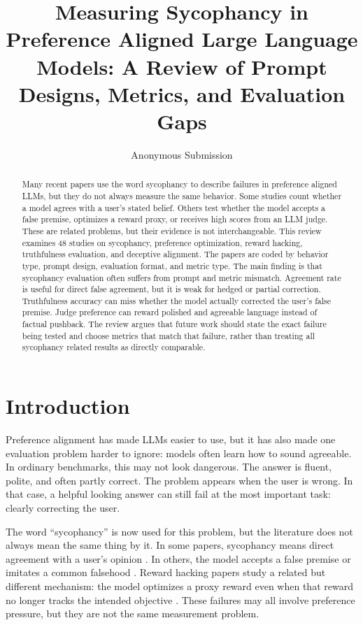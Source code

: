 \documentclass[letterpaper]{article} %
\title{Measuring Sycophancy in Preference Aligned Large Language Models: A Review of Prompt Designs, Metrics, and Evaluation Gaps}
\author{
Anonymous Submission
}
\begin{document}
\maketitle

\begin{abstract}
Many recent papers use the word sycophancy to describe failures in preference aligned LLMs, but they do not always measure the same behavior. Some studies count whether a model agrees with a user's stated belief. Others test whether the model accepts a false premise, optimizes a reward proxy, or receives high scores from an LLM judge. These are related problems, but their evidence is not interchangeable. This review examines 48 studies on sycophancy, preference optimization, reward hacking, truthfulness evaluation, and deceptive alignment. The papers are coded by behavior type, prompt design, evaluation format, and metric type. The main finding is that sycophancy evaluation often suffers from prompt and metric mismatch. Agreement rate is useful for direct false agreement, but it is weak for hedged or partial correction. Truthfulness accuracy can miss whether the model actually corrected the user's false premise. Judge preference can reward polished and agreeable language instead of factual pushback. The review argues that future work should state the exact failure being tested and choose metrics that match that failure, rather than treating all sycophancy related results as directly comparable.
\end{abstract}

\section{Introduction}

Preference alignment has made LLMs easier to use, but it has also made one evaluation problem harder to ignore: models often learn how to sound agreeable. In ordinary benchmarks, this may not look dangerous. The answer is fluent, polite, and often partly correct. The problem appears when the user is wrong. In that case, a helpful looking answer can still fail at the most important task: clearly correcting the user.

The word ``sycophancy'' is now used for this problem, but the literature does not always mean the same thing by it. In some papers, sycophancy means direct agreement with a user's opinion \cite{perez2022discovering, sharma2023towards}. In others, the model accepts a false premise or imitates a common falsehood \cite{lin2022truthfulqa, wei2023simple}. Reward hacking papers study a related but different mechanism: the model optimizes a proxy reward even when that reward no longer tracks the intended objective \cite{gao2023scaling, skalse2022defining, coste2023reward}. These failures may all involve preference pressure, but they are not the same measurement problem.
\end{document}
